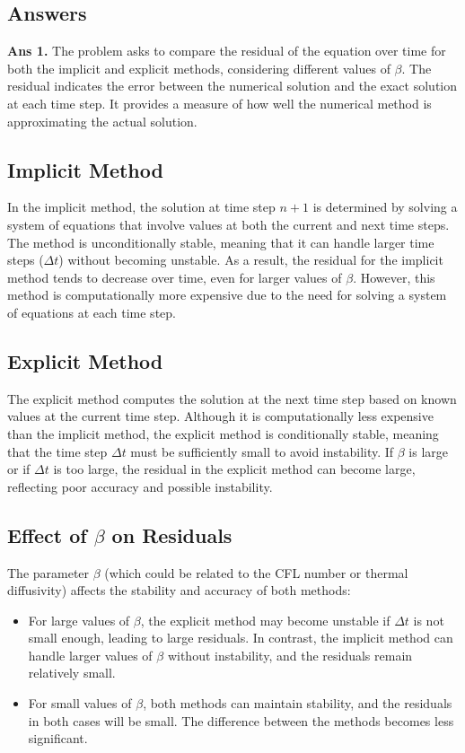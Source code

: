 \documentclass[12pt]{article}
\begin{document}
\subsection*{Answers}

\textbf{Ans 1.} The problem asks to compare the residual of the equation over time for both the implicit and explicit methods, considering different values of \( \beta \). The residual indicates the error between the numerical solution and the exact solution at each time step. It provides a measure of how well the numerical method is approximating the actual solution.

\subsection*{Implicit Method}
In the implicit method, the solution at time step \( n+1 \) is determined by solving a system of equations that involve values at both the current and next time steps. The method is unconditionally stable, meaning that it can handle larger time steps (\( \Delta t \)) without becoming unstable. As a result, the residual for the implicit method tends to decrease over time, even for larger values of \( \beta \). However, this method is computationally more expensive due to the need for solving a system of equations at each time step.

\subsection*{Explicit Method}
The explicit method computes the solution at the next time step based on known values at the current time step. Although it is computationally less expensive than the implicit method, the explicit method is conditionally stable, meaning that the time step \( \Delta t \) must be sufficiently small to avoid instability. If \( \beta \) is large or if \( \Delta t \) is too large, the residual in the explicit method can become large, reflecting poor accuracy and possible instability.

\subsection*{Effect of \( \beta \) on Residuals}
The parameter \( \beta \) (which could be related to the CFL number or thermal diffusivity) affects the stability and accuracy of both methods:
\begin{itemize}
    \item For large values of \( \beta \), the explicit method may become unstable if \( \Delta t \) is not small enough, leading to large residuals. In contrast, the implicit method can handle larger values of \( \beta \) without instability, and the residuals remain relatively small.
    \item For small values of \( \beta \), both methods can maintain stability, and the residuals in both cases will be small. The difference between the methods becomes less significant.
\end{itemize}
\end{document}
